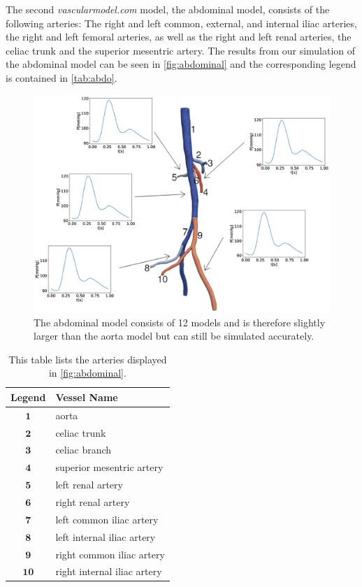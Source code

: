 \documentclass[a4paper, oneside]{discothesis}
\begin{document}
The second \emph{vascularmodel.com} model, the abdominal model, consists of the following arteries: 
The right and left common, external, and internal iliac arteries, the right and left femoral arteries, as well as the right and left renal arteries, the celiac trunk and the superior mesentric artery.
The results from our simulation of the abdominal model can be seen in \autoref{fig:abdominal} and the corresponding legend is contained in \autoref{tab:abdo}.
\begin{figure} [!h]
	\centering
	\includegraphics[width=0.8\columnwidth]{figures/0029.eps}
	\caption{The abdominal model consists of 12 models and is therefore slightly larger than the aorta model but can still be simulated accurately.}
	\label{fig:abdominal}
\end{figure}
\begin{table}[!h]
	\begin{center}
		\begin{tabular}{|c|l|}
			\hline
			Legend & Vessel Name\\
			\hline
			$\mathbf{1}$& aorta \\ 
			$\mathbf{2}$& celiac trunk \\
			$\mathbf{3}$& celiac branch \\
			$\mathbf{4}$& superior mesentric artery \\
			$\mathbf{5}$& left renal artery \\
			$\mathbf{6}$& right renal artery \\
			$\mathbf{7}$& left common iliac artery \\
			$\mathbf{8}$& left internal iliac artery \\
			$\mathbf{9}$& right common iliac artery \\
			$\mathbf{10}$& right internal iliac artery \\
			\hline
		\end{tabular}
	\end{center}
	\caption{This table lists the arteries displayed in \autoref{fig:abdominal}.}
	\label{tab:abdo}
\end{table}
\end{document}

